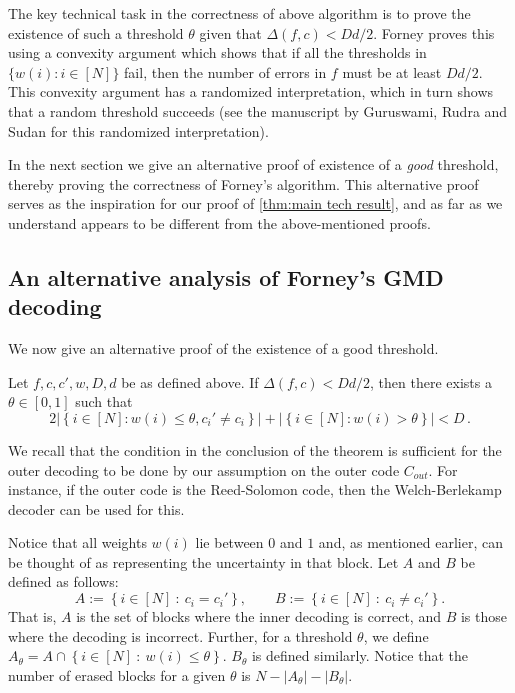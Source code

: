 \documentclass{theoretics}
\def\inbrace#1{\left\{ #1 \right\}}
\def\setdef#1#2{\inbrace{ #1 \ \colon \ #2}}      %
\begin{document}
	The key technical task in the correctness of above algorithm is to
	prove the existence of such a threshold $\theta$ given that
	$\Delta(f, c) < Dd/2$. Forney proves this using a convexity argument
	which shows that if all the thresholds in
	$\{ w(i) \colon i \in [N] \}$ fail, then the number of errors in $f$
	must be at least $Dd/2$. This convexity argument has a randomized
	interpretation, which in turn shows that a random threshold succeeds
	(see the manuscript by Guruswami, Rudra and Sudan
	\cite[Section~12.3]{GuruswamiRS} for this randomized interpretation).
	
	In the next section we give an alternative proof of existence of a \emph{good} threshold, thereby proving the correctness of Forney's algorithm. This alternative proof serves as the inspiration for our proof of \cref{thm:main tech result}, and as far as we understand appears to be different from the above-mentioned proofs.
	
	\subsection{An alternative analysis of Forney's GMD decoding}\label{subsec: alternate_Forney}
	We now give an alternative proof of the existence of a good threshold.
	
	
	\begin{theorem}[Forney]\label{THM:GOOD_THRESHOLD_FORNEY}
		Let $f, c, c', w, D, d$ be as defined above. If $\Delta(f,c) < Dd/2$, then there exists a $\theta \in [0,1]$ such that 
		\[
		2\left| \left\{ i \in [N] \colon w(i) \leq  \theta, c_i' \neq c_i
		\right\} \right| + \left| \left\{ i \in [N] \colon w(i) > \theta \right\} \right| < D \, .
		\]
	\end{theorem}
	We recall that the condition in the conclusion of the theorem is sufficient for the outer decoding to be done by our assumption on the outer code $C_{out}$. For instance, if the outer code is the Reed-Solomon code, then the Welch-Berlekamp decoder can be used for this. 
	
	Notice that all weights $w(i)$ lie between $0$ and $1$ and, as mentioned earlier, can be thought of as representing the uncertainty in that block. 
	Let $A$ and $B$ be defined as follows:
	\[A := \setdef{i \in [N]}{c_i = c_i'}, \qquad B := \setdef{i \in
		[N]}{c_i \neq c_i'}.\]
	That is, $A$ is the set of blocks where the inner decoding is correct, and $B$ is those where the decoding is incorrect. Further, for a threshold $\theta$, we define $A_{\theta} = A \cap \setdef{i \in [N]}{w(i) \leq \theta}$. $B_{\theta}$ is defined similarly. Notice that the number of erased blocks for a given $\theta$ 
	is $N - |A_{\theta}| - |B_{\theta}|$.
	
\end{document}
